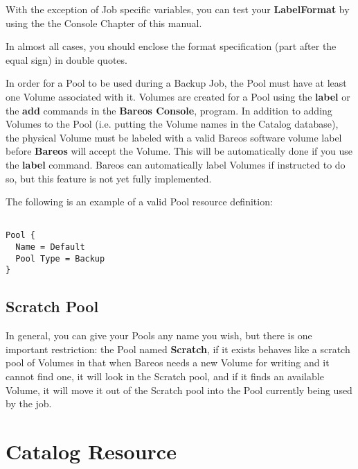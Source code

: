 \begin{description}
With the exception of Job specific variables, you can test your {\bf
LabelFormat} by using the  the Console Chapter
of this manual.

In almost all cases, you should enclose the format specification (part
after the equal sign) in double quotes.



\end{description}

In order for a Pool to be used during a Backup Job, the Pool must have at
least one Volume associated with it.  Volumes are created for a Pool using
the {\bf label} or the {\bf add} commands in the {\bf Bareos Console},
program.  In addition to adding Volumes to the Pool (i.e.  putting the
Volume names in the Catalog database), the physical Volume must be labeled
with a valid Bareos software volume label before {\bf Bareos} will accept
the Volume.  This will be automatically done if you use the {\bf label}
command.  Bareos can automatically label Volumes if instructed to do so,
but this feature is not yet fully implemented.

The following is an example of a valid Pool resource definition:

\footnotesize
\begin{verbatim}

Pool {
  Name = Default
  Pool Type = Backup
}
\end{verbatim}
\normalsize

\subsection{Scratch Pool}
\label{TheScratchPool}

In general, you can give your Pools any name you wish, but there is one
important restriction: the Pool named {\bf Scratch}, if it exists behaves
like a scratch pool of Volumes in that when Bareos needs a new Volume for
writing and it cannot find one, it will look in the Scratch pool, and if
it finds an available Volume, it will move it out of the Scratch pool into
the Pool currently being used by the job.

\section{Catalog Resource}
\label{CatalogResource}


